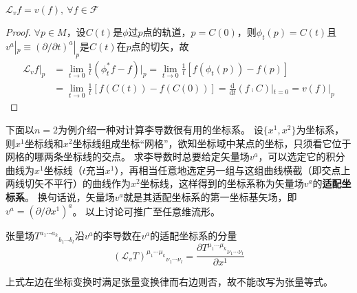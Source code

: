 \begin{theorem}
$\mathscr{L}_vf = v(f), ~ \forall f \in \mathscr{F}$
\end{theorem}

\begin{proof}
$\forall p \in M$，设$C(t)$是$\phi$过$p$点的轨道，$p = C(0)$，则$\phi_t(p) = C(t)$且$v^a|_p \equiv (\partial / \partial t)^a|_p$是$C(t)$在$p$点的切矢，故
$$\begin{aligned}
\mathscr{L}_vf|_p & = \lim_{t \to 0}\frac{1}{t}(\phi_t^*f - f)|_p = \lim_{t \to 0}\frac{1}{t}[f(\phi_t(p)) - f(p)] \\
& = \lim_{t \to 0}\frac{1}{t}[f(C(t)) - f(C(0))] = \frac{\mathrm{d}}{\mathrm{d}t}(f \comp C)|_{t = 0} = v(f)|_p
\end{aligned}$$
\end{proof}

下面以$n = 2$为例介绍一种对计算李导数很有用的坐标系。
设$\{x^1, x^2\}$为坐标系，则$x^1$坐标线和$x^2$坐标线组成坐标``网格''，欲知坐标域中某点的坐标，只须看它位于网格的哪两条坐标线的交点。
求李导数时总要给定矢量场$v^a$，可以选定它的积分曲线为$x^1$坐标线（$t$充当$x^1$），再相当任意地选定另一组与这组曲线横截（即交点上两线切矢不平行）的曲线作为$x^2$坐标线，这样得到的坐标系称为矢量场$v^a$的\textbf{适配坐标系}。
换句话说，矢量场$v^a$就是其适配坐标系的第一坐标基矢场，即$v^a = (\partial / \partial x^1)^a$。
以上讨论可推广至任意维流形。

\begin{theorem}
张量场$T^{a_1 \cdots a_k}{}_{b_1 \cdots b_l}$沿$v^a$的李导数在$v^a$的适配坐标系的分量
$$(\mathscr{L}_vT)^{\mu_1 \cdots \mu_k}{}_{\nu_1 \cdots \nu_l} = \frac{\partial T^{\mu_1 \cdots \mu_k}{}_{\nu_1 \cdots \nu_l}}{\partial x^1}$$
\end{theorem}

\begin{note}
上式左边在坐标变换时满足张量变换律而右边则否，故不能改写为张量等式。
\end{note}

